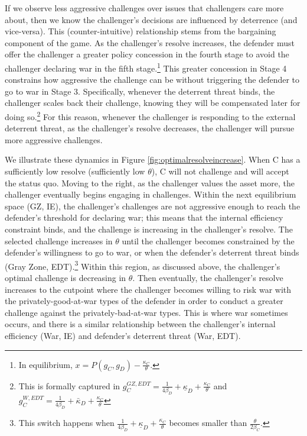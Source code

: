 \documentclass[11pt,letterpaper,pdftex,dvipsnames,table]{article}
\begin{document}
If we observe less aggressive challenges over issues that challengers care more about, then we know the challenger's decisions are influenced by deterrence (and vice-versa). This (counter-intuitive) relationship stems from the bargaining component of the game. As the challenger's resolve increases, the defender must offer the challenger a greater policy concession in the fourth stage to avoid the challenger declaring war in the fifth stage.\footnote{In equilibrium, $x=P(g_{C},g_{D})-\frac{\kappa_{C}}{\theta}.$} This greater concession in Stage 4 constrains how aggressive the challenge can be without triggering the defender to go to war in Stage 3. Specifically, whenever the deterrent threat binds, the challenger scales back their challenge, knowing they will be compensated later for doing so.\footnote{This is formally captured in $g_{C}^{GZ,EDT}=\frac{1}{4\beta_{D}}+\underline{\kappa}_{D}+\frac{\kappa_{C}}{\theta}$ and $g_{C}^{W,EDT}=\frac{1}{4\beta_{D}}+\bar{\kappa}_{D}+\frac{\kappa_{C}}{\theta}$} For this reason, whenever the challenger is responding to the external deterrent threat, as the challenger's resolve decreases, the challenger will pursue more aggressive challenges. 

We illustrate these dynamics in Figure \ref{fig:optimalresolveincrease}. When C has a sufficiently low resolve (sufficiently low $\theta$), C will not challenge and will accept the status quo. Moving to the right, as the challenger values the asset more, the challenger eventually begins engaging in challenges. Within the next equilibrium space (GZ, IE), the challenger's challenges are not aggressive enough to reach the defender's threshold for declaring war; this means that the internal efficiency constraint binds, and the challenge is increasing in the challenger's resolve. The selected challenge increases in $\theta$ until the challenger becomes constrained by the defender's willingness to go to war, or when the defender's deterrent threat binds (Gray Zone, EDT).\footnote{This switch happens when $\frac{1}{4\beta_{D}}+\underline{\kappa}_{D}+\frac{\kappa_{C}}{\theta}$ becomes smaller than $\frac{\theta}{2\beta_{C}}.$} Within this region, as discussed above, the challenger's optimal challenge is decreasing in $\theta$. Then eventually, the challenger's resolve increases to the cutpoint where the challenger becomes willing to risk war with the privately-good-at-war types of the defender in order to conduct a greater challenge against the privately-bad-at-war types. This is where war sometimes occurs, and there is a similar relationship between the challenger's internal efficiency (War, IE) and defender's deterrent threat (War, EDT). 
\end{document}
